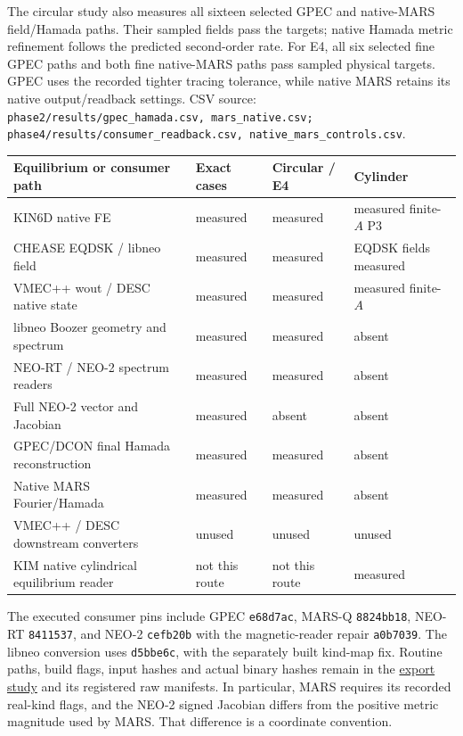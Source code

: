 \documentclass[10pt,a4paper]{article}
\newcommand{\tcroot}{https://gitlab.tugraz.at/plasma/proj/ntv/iter_tc24/-/blob/5f267d12c/}
\newcommand{\tcfile}[2]{\href{\tcroot#1}{#2}}
\newcommand{\dataref}[1]{{\footnotesize CSV source: \texttt{#1}}}
\begin{document}
The circular study also measures all sixteen selected GPEC and native-MARS
field/Hamada paths. Their sampled fields pass the targets; native Hamada
metric refinement follows the predicted second-order rate.
For E4, all six selected fine GPEC paths and both fine native-MARS paths
pass sampled physical targets. GPEC uses the recorded tighter tracing
tolerance, while native MARS retains its native output/readback settings.
\dataref{phase2/results/gpec\_hamada.csv, mars\_native.csv;
phase4/results/consumer\_readback.csv, native\_mars\_controls.csv}.

\begin{center}\small
\begin{tabular}{p{61mm}p{30mm}p{30mm}p{30mm}}
\toprule
Equilibrium or consumer path & Exact cases & Circular / E4 & Cylinder \\
\midrule
KIN6D native FE & measured & measured & measured finite-$A$ P3 \\
CHEASE EQDSK / libneo field & measured & measured & EQDSK fields measured \\
VMEC++ wout / DESC native state & measured & measured & measured finite-$A$ \\
libneo Boozer geometry and spectrum & measured & measured & absent \\
NEO-RT / NEO-2 spectrum readers & measured & measured & absent \\
Full NEO-2 vector and Jacobian & measured & absent & absent \\
GPEC/DCON final Hamada reconstruction & measured & measured & absent \\
Native MARS Fourier/Hamada & measured & measured & absent \\
VMEC++ / DESC downstream converters & unused & unused & unused \\
KIM native cylindrical equilibrium reader & not this route & not this route & measured \\
\bottomrule
\end{tabular}
\end{center}

The executed consumer pins include GPEC \texttt{e68d7ac}, MARS-Q
\texttt{8824bb18}, NEO-RT \texttt{8411537}, and NEO-2 \texttt{cefb20b}
with the magnetic-reader repair \texttt{a0b7039}. The libneo conversion uses
\texttt{d5bbe6c}, with the separately built kind-map fix. Routine paths,
build flags, input hashes and actual binary hashes remain in the
\tcfile{equilibrium/phase1/results_export/README.md}{export study} and its
registered raw manifests. In particular, MARS requires its recorded real-kind
flags, and the NEO-2 signed Jacobian differs from the positive metric magnitude
used by MARS. That difference is a coordinate convention.
\end{document}

